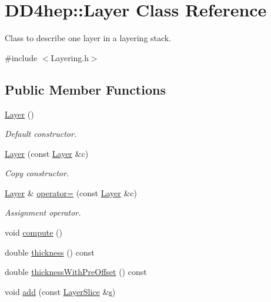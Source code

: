\hypertarget{class_d_d4hep_1_1_layer}{
\section{DD4hep::Layer Class Reference}
\label{class_d_d4hep_1_1_layer}
}


Class to describe one layer in a layering stack.  


{\ttfamily \#include $<$Layering.h$>$}\subsection*{Public Member Functions}
\begin{DoxyCompactItemize}
\item 
\hyperlink{class_d_d4hep_1_1_layer_a23e603ff080b2c6e9a9016b401fdac20}{Layer} ()
\begin{DoxyCompactList}\small\item\em Default constructor. \item\end{DoxyCompactList}\item 
\hyperlink{class_d_d4hep_1_1_layer_ad051c4b9774da0a2196045ef138d59b4}{Layer} (const \hyperlink{class_d_d4hep_1_1_layer}{Layer} \&c)
\begin{DoxyCompactList}\small\item\em Copy constructor. \item\end{DoxyCompactList}\item 
\hyperlink{class_d_d4hep_1_1_layer}{Layer} \& \hyperlink{class_d_d4hep_1_1_layer_adc08802cc74ff34cb73d593b79181394}{operator=} (const \hyperlink{class_d_d4hep_1_1_layer}{Layer} \&c)
\begin{DoxyCompactList}\small\item\em Assignment operator. \item\end{DoxyCompactList}\item 
void \hyperlink{class_d_d4hep_1_1_layer_a7353fc97976976a6d739e37af18954de}{compute} ()
\item 
double \hyperlink{class_d_d4hep_1_1_layer_a6dbbae6999664e05a6e0217622c4f099}{thickness} () const 
\item 
double \hyperlink{class_d_d4hep_1_1_layer_a65c459b750a25cff5e86b8bcc1048b02}{thicknessWithPreOffset} () const 
\item 
void \hyperlink{class_d_d4hep_1_1_layer_a0e2f64de27f1eae32c830a83df7793ed}{add} (const \hyperlink{class_d_d4hep_1_1_layer_slice}{LayerSlice} \&\hyperlink{_volumes_8cpp_a17ca6bfc8040d695d3cada22a4763d40}{s})
\end{DoxyCompactItemize}
